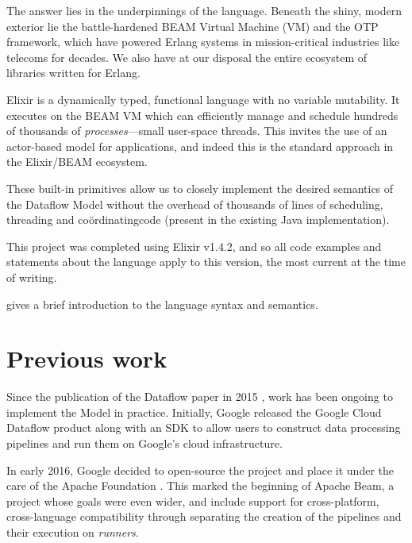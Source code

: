 The answer lies in the underpinnings of the language.
Beneath the shiny, modern exterior lie the battle-hardened BEAM Virtual Machine (VM) and the OTP framework, which have powered Erlang systems in mission-critical industries like telecoms for decades.
We also have at our disposal the entire ecosystem of libraries written for Erlang.

Elixir is a dynamically typed, functional language with no variable mutability. 
It executes on the BEAM VM which can efficiently manage and schedule hundreds of thousands of \emph{processes}---small user-space threads.
This invites the use of an actor-based model for applications, and indeed this is the standard approach in the Elixir/BEAM ecosystem.

These built-in primitives allow us to closely implement the desired semantics of the Dataflow Model without the overhead of thousands of lines of scheduling, threading and co\"ordinating\footnotemark[1] code (present in the existing Java implementation).


This project was completed using Elixir v1.4.2, and so all code examples and statements about the language apply to this version, the most current at the time of writing.

 gives a brief introduction to the language syntax and semantics.



\section{Previous work}\label{sec:intro:previous}
Since the publication of the Dataflow paper in 2015 \cite{Akidau:2015}, work has been ongoing to implement the Model in practice.
Initially, Google released the Google Cloud Dataflow product \cite{CloudDataflow} along with an SDK to allow users to construct data processing pipelines and run them on Google's cloud infrastructure.

In early 2016, Google decided to open-source the project and place it under the care of the Apache Foundation \cite{ApacheDataflowPost}.
This marked the beginning of Apache Beam, a project whose goals were even wider, and include support for cross-platform, cross-language compatibility through separating the creation of the pipelines and their execution on \emph{runners}.

